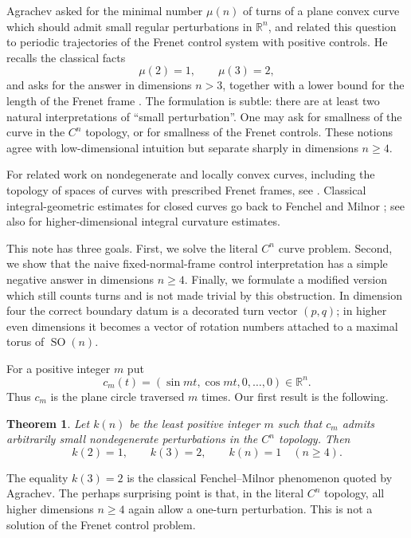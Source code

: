 \documentclass[11pt,reqno]{amsart}
\newtheorem{theorem}{Theorem}[section]
\theoremstyle{definition}
\theoremstyle{remark}
\newcommand{\R}{\mathbb R}
\newcommand{\SO}{\operatorname{SO}}
\begin{document}
Agrachev asked for the minimal number $\mu(n)$ of turns of a plane convex curve
which should admit small regular perturbations in $\R^n$, and related this question
to periodic trajectories of the Frenet control system with positive controls.  He
recalls the classical facts
\[
        \mu(2)=1,\qquad \mu(3)=2,
\]
and asks for the answer in dimensions $n>3$, together with a lower bound for the
length of the Frenet frame \cite[Sec.~VI]{Agrachev}.  The formulation is subtle:
there are at least two natural interpretations of ``small perturbation''.  One may ask
for smallness of the curve in the $C^n$ topology, or for smallness of the Frenet
controls.  These notions agree with low-dimensional intuition but separate sharply
in dimensions $n\ge4$.

For related work on nondegenerate and locally convex curves, including the topology
of spaces of curves with prescribed Frenet frames, see
\cite{ShapiroShapiro,SaldanhaShapiro}.  Classical integral-geometric estimates for
closed curves go back to Fenchel and Milnor \cite{Fenchel,Milnor}; see also
\cite{NovikovYakovenko} for higher-dimensional integral curvature estimates.

This note has three goals.  First, we solve the literal $C^n$ curve problem.  Second,
we show that the naive fixed-normal-frame control interpretation has a simple
negative answer in dimensions $n\ge4$.  Finally, we formulate a modified version
which still counts turns and is not made trivial by this obstruction.  In dimension
four the correct boundary datum is a decorated turn vector $(p,q)$; in higher even
dimensions it becomes a vector of rotation numbers attached to a maximal torus of
$\SO(n)$.

For a positive integer $m$ put
\[
        c_m(t)=(\sin mt,\cos mt,0,\ldots,0)\in\R^n .
\]
Thus $c_m$ is the plane circle traversed $m$ times.  Our first result is the following.

\begin{theorem}\label{thm:Cn-main}
Let $k(n)$ be the least positive integer $m$ such that $c_m$ admits arbitrarily
small nondegenerate perturbations in the $C^n$ topology.  Then
\[
        k(2)=1,\qquad k(3)=2,\qquad k(n)=1\quad(n\ge4).
\]
\end{theorem}

The equality $k(3)=2$ is the classical Fenchel--Milnor phenomenon quoted by
Agrachev.  The perhaps surprising point is that, in the literal $C^n$ topology, all
higher dimensions $n\ge4$ again allow a one-turn perturbation.  This is not a
solution of the Frenet control problem.
\end{document}
